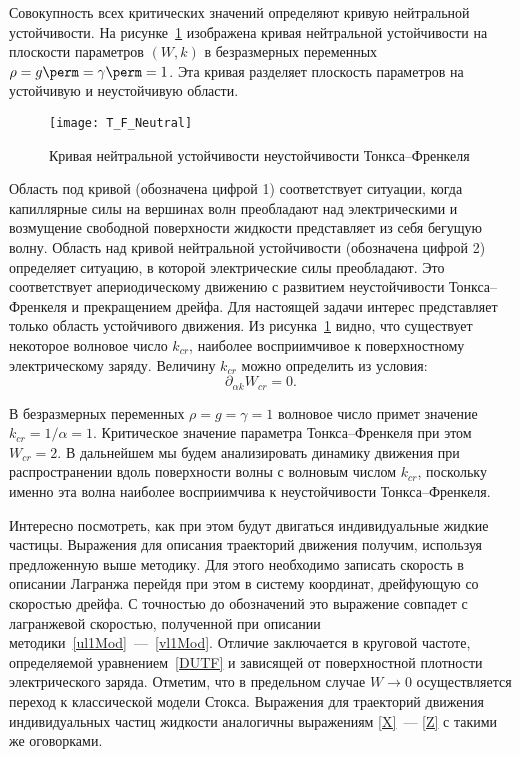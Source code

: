 Совокупность всех критических значений определяют кривую нейтральной устойчивости. На рисунке~\ref{fig:NeutralW} изображена кривая нейтральной устойчивости на плоскости параметров  $ \left(W, k \right) $ в безразмерных переменных $ \rho=g\perm=\gamma\perm=1 $. Эта кривая разделяет плоскость параметров на устойчивую и неустойчивую области.
\begin{figure}[h]
\centering
\texttt{[image: T\_F\_Neutral]}
\caption{Кривая нейтральной устойчивости неустойчивости Тонкса--Френкеля}\label{fig:NeutralW}
\end{figure}
	Область под кривой (обозначена цифрой 1) соответствует ситуации, когда капиллярные силы на вершинах волн преобладают над электрическими и возмущение свободной поверхности жидкости представляет из себя бегущую волну. Область над кривой нейтральной устойчивости (обозначена цифрой 2) определяет ситуацию, в которой электрические силы преобладают. Это соответствует апериодическому движению с развитием неустойчивости Тонкса--Френкеля и прекращением дрейфа. Для настоящей задачи интерес представляет только область устойчивого движения. Из рисунка~\ref{fig:NeutralW} видно, что существует некоторое волновое число  $ k_{cr} $, наиболее восприимчивое к поверхностному электрическому заряду. Величину  $ k_{cr} $  можно определить из условия: 
\begin{equation*}
\partial_{\alpha k}W_{cr}=0.
\end{equation*}
	 
В безразмерных переменных $ \rho=g=\gamma=1 $  волновое число примет значение  $ k_{cr}=1/\alpha=1 $. Критическое значение параметра Тонкса--Френкеля при этом  $ W_{cr}=2 $. В дальнейшем мы будем анализировать динамику движения при распространении вдоль поверхности волны с волновым числом $ k_{cr} $, поскольку именно эта волна наиболее восприимчива к неустойчивости Тонкса--Френкеля.


Интересно посмотреть, как при этом будут двигаться индивидуальные жидкие частицы. Выражения для описания траекторий движения получим, используя предложенную выше методику. Для этого необходимо записать скорость в описании Лагранжа перейдя при этом в систему координат, дрейфующую со скоростью дрейфа. С точностью до обозначений это выражение совпадет с лагранжевой скоростью, полученной при описании методики~\eqref{ul1Mod}~---~\eqref{vl1Mod}. Отличие заключается в круговой частоте, определяемой уравнением~\eqref{DUTF} и зависящей от поверхностной плотности электрического заряда. Отметим, что в предельном случае  $ W \rightarrow 0 $ осуществляется переход к классической модели Стокса. Выражения для траекторий движения индивидуальных частиц жидкости аналогичны выражениям \eqref{X}~--- \eqref{Z} с такими же оговорками. 


